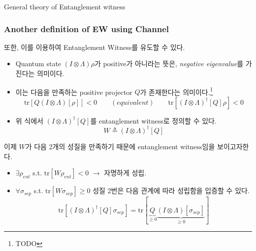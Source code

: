 \documentclass[9pt]{beamer}
\begin{document}
\begin{section}{General theory of  Entanglement witness}
        \begin{frame}
            \frametitle{Another definition of EW using Channel}
            또한, 이를 이용하여 Entanglement Witness를 유도할 수 있다. 
            \begin{itemize}
                \item Quantum state $(I\otimes \Lambda)\rho$가 positive가 아니라는 뜻은, \textit{negative eigenvalue}를 가진다는 의미이다.
                \item 이는 다음을 만족하는 positive projector $Q$가 존재한다는 의미이다.\footnote{TODO}
                \begin{equation*}
                    \text{tr} [Q (I \otimes \Lambda)[\rho]] < 0 \qquad (equivalent) \qquad  \text{tr} [ (I \otimes \Lambda)^\dagger [Q] \rho] < 0
                \end{equation*}
                \item 위 식에서 $(I\otimes \Lambda)^\dagger[Q]$를 \alert{entanglement witness}로 정의할 수 있다. 
                \begin{equation*}
                    W \triangleq (I\otimes \Lambda)^\dagger[Q]
                \end{equation*}
            \end{itemize}
            \vspace{0.2cm}
            이제 $W$가 다음 2개의 성질을 만족하기 때문에 entanglement witness임을 보이고자한다.
            \begin{itemize}
                \item $\exists \rho_{ent}$ s.t. $\text{tr}[W\rho_{ent}] < 0$ $\rightarrow$ 자명하게 성립.
                \item $\forall \sigma_{sep}$ s.t. $\text{tr}[W\sigma_{sep}] \ge 0$
                성질 2번은 다음 관계에 따라 성립함을 입증할 수 있다.
                \begin{equation*}
                    \text{tr}[(I \otimes \Lambda)^\dagger [Q] \sigma_{sep}] = \text{tr}[\underbrace{Q}_{\ge 0} \underbrace{(I \otimes \Lambda)[\sigma_{sep}]}_{\ge 0}]
                \end{equation*}
            \end{itemize}
        \end{frame}


\end{section}
\end{document}

